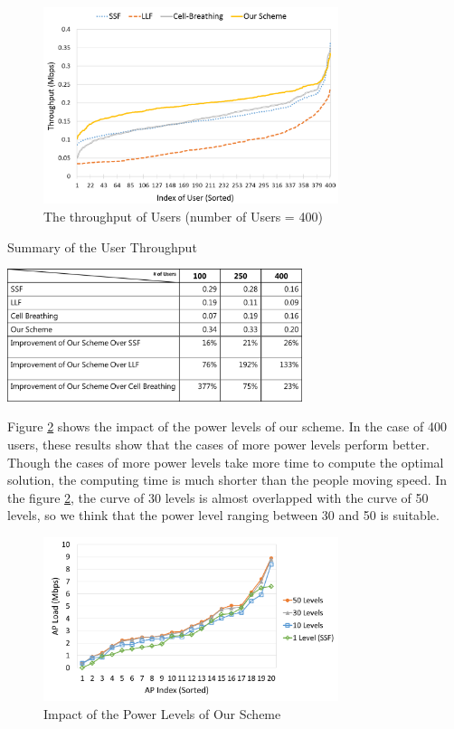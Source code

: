 \begin{figure}[tbp]
\begin{center}
\includegraphics[width=3.4in]{images/Average_user_throughput.png}
\end{center}
\caption{The throughput of Users (number of Users = 400)}
\label{fig:Average-user-throughput}
\end{figure}

\begin{table}[tbp]
\setlength{\belowcaptionskip}{15pt}
\centering
\caption{Summary of the User Throughput}
\label{tab:Average-user-throughput}
\includegraphics[width=3.4in]{images/table4_4.png}
\end{table}

Figure \ref{fig:Levels} shows the impact of the power levels of our scheme. In the case of 400 users, these results show that the cases of more power levels perform better. Though the cases of more power levels take more time to compute the optimal solution, the computing time is much shorter than the people moving speed. In the figure \ref{fig:Levels}, the curve of 30 levels is almost overlapped with the curve of 50 levels, so we think that the power level ranging between 30 and 50 is suitable.

\begin{figure}[tbp]
\begin{center}
\includegraphics[width=3.4in]{images/Levels.png}
\end{center}
\caption{Impact of the Power Levels of Our Scheme}
\label{fig:Levels}
\end{figure}

